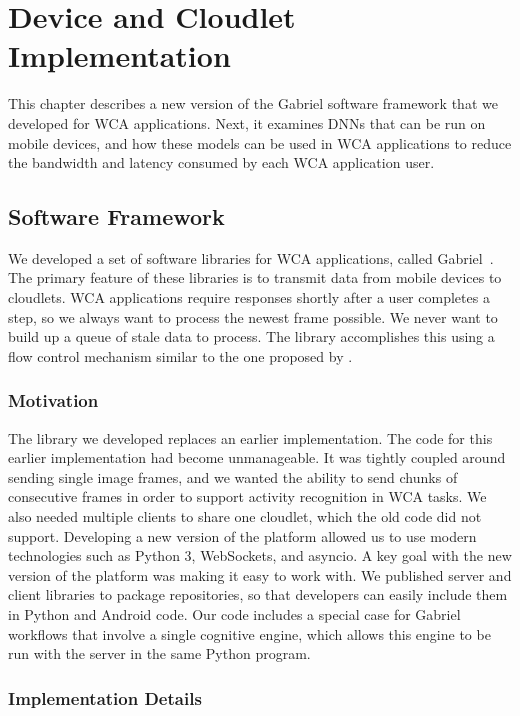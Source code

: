 \chapter{Device and Cloudlet Implementation}\label{chap:implementation}

This chapter describes a new version of the Gabriel software framework that we
developed for WCA applications.
Next, it examines DNNs that can be run on mobile devices, and how
these models can be used in WCA applications to reduce the bandwidth and
latency consumed by each WCA application user.

\section{Software Framework}

We developed a set of software libraries for WCA applications, called
Gabriel~\cite{gabriel_github}.
The primary feature of these libraries is to transmit data from mobile devices
to cloudlets.
WCA applications require responses shortly after a user completes a step, so
we always want to process the newest frame possible. We never want to build up
a queue of stale data to process. The library accomplishes this using a flow
control mechanism similar to the one proposed by \citet{ha2014}.

\subsection{Motivation}

The library we developed replaces an earlier implementation.
The code for this earlier implementation had become unmanageable.
It was tightly coupled around sending single image frames, and we
wanted the ability to send chunks of consecutive frames in order to support
activity recognition in WCA tasks.
We also needed multiple clients to share one cloudlet, which the old code did
not support.
Developing a new version of the platform allowed us to use modern technologies
such as Python 3, WebSockets, and asyncio.
A key goal with the new version of the platform was making it easy to work with.
We published server and client libraries to package repositories, so that
developers can easily include them in Python and Android code.
Our code includes a special case for Gabriel workflows that involve a single
cognitive engine, which allows this engine to be run with the server in the same
Python program.

\subsection{Implementation Details}

